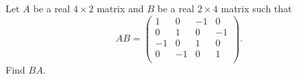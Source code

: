 Let \(A\) be a real \(4\times 2\) matrix and \(B\) be a real \(2\times 4\) matrix such that
\[ AB = \left(%
\begin{array}{cccc}
  1 & 0 & -1 & 0 \\
  0 & 1 & 0 & -1 \\
  -1 & 0 & 1 & 0 \\
  0 & -1 & 0 & 1 \\
\end{array}%
\right). \]
Find \(BA\).